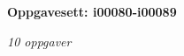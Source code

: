 \centerline{\bf Oppgavesett: i00080-i00089}
\vskip 10pt
\centerline{\it 10 oppgaver}\vskip 10pt
\vskip 10pt
